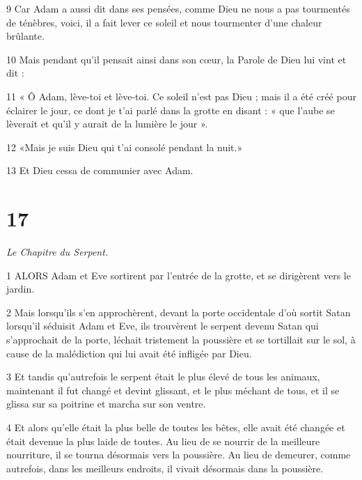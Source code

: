 \par 9 Car Adam a aussi dit dans ses pensées, comme Dieu ne nous a pas tourmentés de ténèbres, voici, il a fait lever ce soleil et nous tourmenter d'une chaleur brûlante.

\par 10 Mais pendant qu'il pensait ainsi dans son cœur, la Parole de Dieu lui vint et dit :

\par 11 « Ô Adam, lève-toi et lève-toi. Ce soleil n'est pas Dieu ; mais il a été créé pour éclairer le jour, ce dont je t'ai parlé dans la grotte en disant : « que l'aube se lèverait et qu'il y aurait de la lumière le jour ».

\par 12 «Mais je suis Dieu qui t'ai consolé pendant la nuit.»

\par 13 Et Dieu cessa de communier avec Adam.



\chapter{17}

\par \textit{Le Chapitre du Serpent.}

\par 1 ALORS Adam et Eve sortirent par l'entrée de la grotte, et se dirigèrent vers le jardin.

\par 2 Mais lorsqu'ils s'en approchèrent, devant la porte occidentale d'où sortit Satan lorsqu'il séduisit Adam et Eve, ils trouvèrent le serpent devenu Satan qui s'approchait de la porte, léchait tristement la poussière et se tortillait sur le sol, à cause de la malédiction qui lui avait été infligée par Dieu.

\par 3 Et tandis qu'autrefois le serpent était le plus élevé de tous les animaux, maintenant il fut changé et devint glissant, et le plus méchant de tous, et il se glissa sur sa poitrine et marcha sur son ventre.

\par 4 Et alors qu'elle était la plus belle de toutes les bêtes, elle avait été changée et était devenue la plus laide de toutes. Au lieu de se nourrir de la meilleure nourriture, il se tourna désormais vers la poussière. Au lieu de demeurer, comme autrefois, dans les meilleurs endroits, il vivait désormais dans la poussière.

